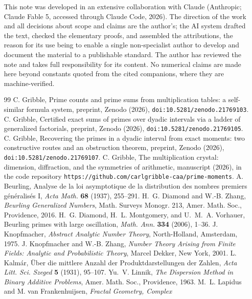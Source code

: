 \documentclass[11pt]{article}
\theoremstyle{remark}
\begin{document}
This note was developed in an extensive collaboration with Claude (Anthropic; Claude Fable 5,
accessed through Claude Code, 2026). The direction of the work and all decisions about scope and
claims are the author's; the AI system drafted the text, checked the elementary proofs, and
assembled the attributions, the reason for its use being to enable a single non-specialist author
to develop and document the material to a publishable standard. The author has reviewed the note
and takes full responsibility for its content. No numerical claims are made here beyond constants
quoted from the cited companions, where they are machine-verified.

\begin{thebibliography}{99}
 C. Gribble, Prime counts and prime sums from multiplication tables: a
self-similar formula system, preprint, Zenodo (2026), \texttt{doi:10.5281/zenodo.21769103}.
 C. Gribble, Certified exact sums of primes over dyadic intervals via a ladder
of generalized factorials, preprint, Zenodo (2026), \texttt{doi:10.5281/zenodo.21769105}.
 C. Gribble, Recovering the primes in a dyadic interval from exact moments:
two constructive routes and an obstruction theorem, preprint, Zenodo (2026),
\texttt{doi:10.5281/zenodo.21769107}.
 C. Gribble, The multiplication crystal: dimension, diffraction, and the symmetries
of arithmetic, manuscript (2026), in the code repository
\texttt{https://github.com/carlgribble-caa/prime-moments}.
 A. Beurling, Analyse de la loi asymptotique de la distribution des nombres
premiers g\'en\'eralis\'es I, \emph{Acta Math.} \textbf{68} (1937), 255--291.
 H.~G. Diamond and W.-B. Zhang, \emph{Beurling Generalized Numbers}, Math.
Surveys Monogr. 213, Amer. Math. Soc., Providence, 2016.
 H.~G. Diamond, H.~L. Montgomery, and U.~M.~A. Vorhauer, Beurling primes with large
oscillation, \emph{Math. Ann.} \textbf{334} (2006), 1--36.
 J. Knopfmacher, \emph{Abstract Analytic Number Theory}, North-Holland,
Amsterdam, 1975.
 J. Knopfmacher and W.-B. Zhang, \emph{Number Theory Arising from Finite
Fields: Analytic and Probabilistic Theory}, Marcel Dekker, New York, 2001.
 L. Kalm\'ar, \"Uber die mittlere Anzahl der Produktdarstellungen der Zahlen,
\emph{Acta Litt. Sci. Szeged} \textbf{5} (1931), 95--107.
 Yu.~V. Linnik, \emph{The Dispersion Method in Binary Additive Problems}, Amer.
Math. Soc., Providence, 1963.
 M.~L. Lapidus and M. van Frankenhuijsen, \emph{Fractal Geometry, Complex
}
\end{thebibliography}
\end{document}
